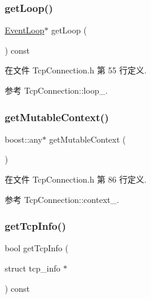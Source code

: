 \subsubsection{\texorpdfstring{get\+Loop()}{getLoop()}}
{\footnotesize\ttfamily \hyperlink{classmuduo_1_1net_1_1EventLoop}{Event\+Loop}$\ast$ get\+Loop (\begin{DoxyParamCaption}{ }\end{DoxyParamCaption}) const\hspace{0.3cm}{\ttfamily [inline]}}



在文件 Tcp\+Connection.\+h 第 55 行定义.



参考 Tcp\+Connection\+::loop\+\_\+.

\mbox{\label{classmuduo_1_1net_1_1TcpConnection_aca752855bdbb8cc6b18d05be1286b8f1}} 
\subsubsection{\texorpdfstring{get\+Mutable\+Context()}{getMutableContext()}}
{\footnotesize\ttfamily boost\+::any$\ast$ get\+Mutable\+Context (\begin{DoxyParamCaption}{ }\end{DoxyParamCaption})\hspace{0.3cm}{\ttfamily [inline]}}



在文件 Tcp\+Connection.\+h 第 86 行定义.



参考 Tcp\+Connection\+::context\+\_\+.

\mbox{\label{classmuduo_1_1net_1_1TcpConnection_a1de4ddf8b40138039f3382ec9c4a0366}} 
\subsubsection{\texorpdfstring{get\+Tcp\+Info()}{getTcpInfo()}}
{\footnotesize\ttfamily bool get\+Tcp\+Info (\begin{DoxyParamCaption}\item[{struct tcp\+\_\+info $\ast$}]{ }\end{DoxyParamCaption}) const}



